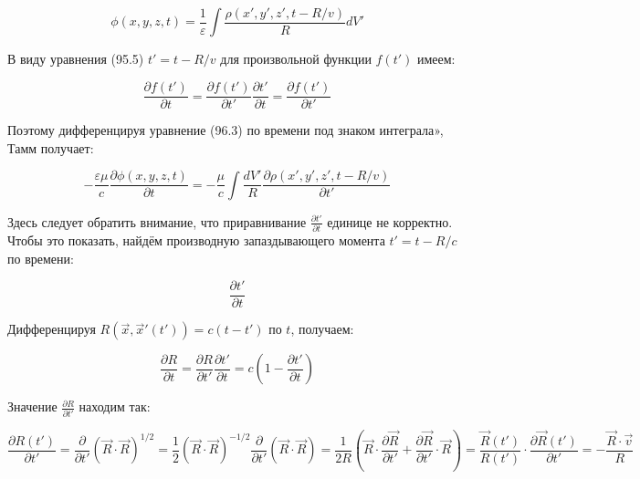 \documentclass[12pt, a4paper]{article}
\begin{document}
\begin{equation}
\phi(x, y, z, t) = \frac{1}{\varepsilon} \int \frac{\rho(x', y', z', t - R/v)}{R} dV'
\label{eq:phi_retarded}
\end{equation}

В виду уравнения (95.5) $t' = t - R/v$ для произвольной функции $f(t')$ имеем:

\begin{equation}
\frac{\partial f(t')}{\partial t} = \frac{\partial f(t')}{\partial t'} \frac{\partial t'}{\partial t} = \frac{\partial f(t')}{\partial t'}
\label{eq:tamm_time_derivative}
\end{equation}

Поэтому дифференцируя уравнение (96.3) по времени под знаком интеграла», Тамм получает:

\begin{equation}
-\frac{\varepsilon \mu}{c} \frac{\partial \phi(x, y, z, t)}{\partial t} = -\frac{\mu}{c} \int \frac{dV'}{R} \frac{\partial \rho(x', y', z', t - R/v)}{\partial t'}
\label{eq:tamm_phi_derivative}
\end{equation}

Здесь следует обратить внимание, что приравнивание $\frac{\partial t'}{\partial t}$ единице не корректно. Чтобы это показать, найдём производную запаздывающего момента $t' = t - R/c$ по времени:

\begin{equation}
\frac{\partial t'}{\partial t}
\label{eq:t_prime_derivative}
\end{equation}

Дифференцируя $R(\vec{x}, \vec{x}'(t')) = c(t - t')$ по $t$, получаем:

\begin{equation}
\frac{\partial R}{\partial t} = \frac{\partial R}{\partial t'} \frac{\partial t'}{\partial t} = c \left( 1 - \frac{\partial t'}{\partial t} \right)
\label{eq:R_derivative}
\end{equation}

Значение $\frac{\partial R}{\partial t'}$ находим так:

\begin{equation}
\frac{\partial R(t')}{\partial t'} = \frac{\partial}{\partial t'} (\vec{R} \cdot \vec{R})^{1/2} = \frac{1}{2} (\vec{R} \cdot \vec{R})^{-1/2} \frac{\partial}{\partial t'} (\vec{R} \cdot \vec{R}) = \frac{1}{2R} \left( \vec{R} \cdot \frac{\partial \vec{R}}{\partial t'} + \frac{\partial \vec{R}}{\partial t'} \cdot \vec{R} \right) = \frac{\vec{R}(t')}{R(t')} \cdot \frac{\partial \vec{R}(t')}{\partial t'} = -\frac{\vec{R} \cdot \vec{v}}{R}
\label{eq:R_t_prime}
\end{equation}
\end{document}
